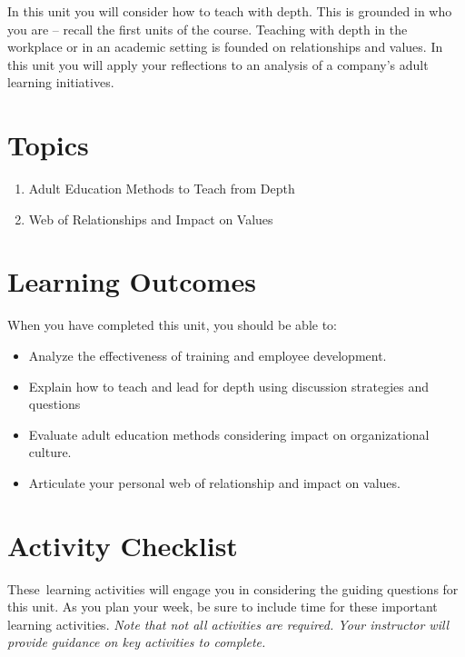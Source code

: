 \documentclass[
]{book}
\begin{document}
In this unit you will consider how to teach with depth. This is grounded
in who you are -- recall the first units of the course. Teaching with
depth in the workplace or in an academic setting is founded on
relationships and values. In this unit you will apply your reflections
to an analysis of a company's adult learning initiatives.

\hypertarget{topics-7}{%
\section*{Topics}\label{topics-7}}

\begin{enumerate}
\def\labelenumi{\arabic{enumi}.}
\item
  Adult Education Methods to Teach from Depth
\item
  Web of Relationships and Impact on Values
\end{enumerate}

\hypertarget{learning-outcomes-7}{%
\section*{Learning Outcomes}\label{learning-outcomes-7}}

When you have completed this unit, you should be able to:

\begin{itemize}
\item
  Analyze the effectiveness of training and employee development.
\item
  Explain how to teach and lead for depth using discussion strategies
  and questions
\item
  Evaluate adult education methods considering impact on
  organizational culture.
\item
  Articulate your personal web of relationship and impact on values.
\end{itemize}

\hypertarget{activity-checklist-7}{%
\section*{Activity Checklist}\label{activity-checklist-7}}

These~learning activities will engage you in considering the guiding questions for this unit. As you plan your week, be sure to include time for these important learning activities. \emph{Note that not all activities are required. Your instructor will provide guidance on key activities to complete.}
\end{document}
